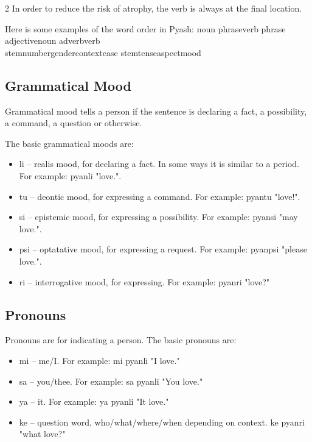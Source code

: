 \documentclass[10pt,pagesize]{article}
\providecommand{\tightlist}{%
  \setlength{\itemsep}{0pt}\setlength{\parskip}{0pt}}
\begin{document}
\begin{multicols}{2}
  In order to reduce the risk of atrophy, the verb is always at the final
  location. 

  Here is some examples of the word order in Pyash:
  {noun phrase}{verb phrase} \\
  {adjective}{noun} {adverb}{verb}\\
  {stem}{number}{gender}{context}{case} {stem}{tense}{aspect}{mood}\\

\subsection{Grammatical Mood}
Grammatical mood tells a person if the sentence is declaring a fact, a possibility, a command, a question or otherwise. 

The basic grammatical moods are:

  \begin{itemize}\tightlist
    \item li -- realis mood, for declaring a fact. In some ways it is similar to a period. For example: pyanli "love.".
    \item tu -- deontic mood, for expressing a command. For example: pyantu "love!".
    \item si  -- epistemic mood, for expressing a possibility. For example: pyansi "may love.".
    \item psi -- optatative mood, for expressing a request. For example: pyanpsi "please love.".
    \item ri -- interrogative mood, for expressing. For example: pyanri "love?"
  \end{itemize}

  \subsection{Pronouns}

Pronouns are for indicating a person.
The basic pronouns are:

  \begin{itemize}\tightlist
    \item mi -- me/I. For example: mi pyanli "I love."
    \item sa -- you/thee. For example: sa pyanli "You love."
    \item ya -- it.  For example: ya pyanli "It love."
    \item ke -- question word, who/what/where/when depending on context. ke pyanri "what love?"
  \end{itemize}


\end{multicols}
\end{document}
